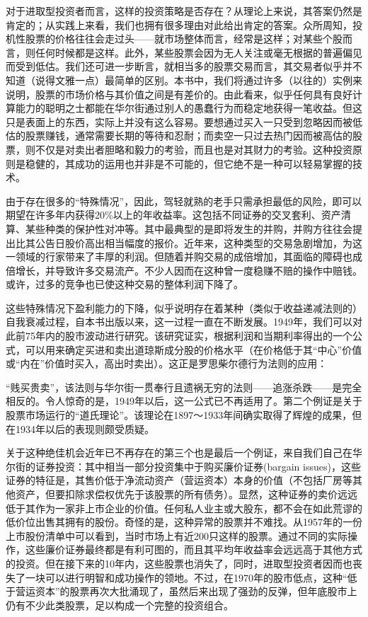 \documentclass[12pt,oneside]{book}
\begin{document}
对于进取型投资者而言，这样的投资策略是否存在？从理论上来说，其答案仍然是肯定的；从实践上来看，我们也拥有很多理由对此给出肯定的答案。众所周知，投机性股票的价格往往会走过头——就市场整体而言，经常是这样；对某些个股而言，则任何时候都是这样。此外，某些股票会因为无人关注或毫无根据的普遍偏见而受到低估。我们还可进一步断言，就相当多的股票交易而言，其交易者似乎并不知道（说得文雅一点）最简单的区别。本书中，我们将通过许多（以往的）实例来说明，股票的市场价格与其价值之间是有差价的。由此看来，似乎任何具有良好计算能力的聪明之士都能在华尔街通过别人的愚蠢行为而稳定地获得一笔收益。但这只是表面上的东西，实际上并没有这么容易。要想通过买入一只受到忽略因而被低估的股票赚钱，通常需要长期的等待和忍耐；而卖空一只过去热门因而被高估的股票，则不仅是对卖出者胆略和毅力的考验，而且也是对其财力的考验。这种投资原则是稳健的，其成功的运用也并非是不可能的，但它绝不是一种可以轻易掌握的技术。

由于存在很多的“特殊情况”，因此，驾轻就熟的老手只需承担最低的风险，即可以期望在许多年内获得20\%以上的年收益率。这包括不同证券的交叉套利、资产清算、某些种类的保护性对冲等。其中最典型的是即将发生的并购，并购方往往会提出比其公告日股价高出相当幅度的报价。近年来，这种类型的交易急剧增加，为这一领域的行家带来了丰厚的利润。但随着并购交易的成倍增加，其面临的障碍也成倍增长，并导致许多交易流产。不少人因而在这种曾一度稳赚不赔的操作中赔钱。或许，过多的竞争也已使这种交易的整体利润下降了。

这些特殊情况下盈利能力的下降，似乎说明存在着某种（类似于收益递减法则的）自我衰减过程，自本书出版以来，这一过程一直在不断发展。1949年，我们可以对此前75年内的股市波动进行研究。该研究证实，根据利润和当期利率得出的一个公式，可以用来确定买进和卖出道琼斯成分股的价格水平（在价格低于其“中心”价值或“内在”价值时买入，高出时卖出）。这正是罗思柴尔德行为法则的应用：

“贱买贵卖”，该法则与华尔街一贯奉行且遗祸无穷的法则——追涨杀跌——是完全相反的。令人惊奇的是，1949年以后，这一公式已不再适用了。第二个例证是关于股票市场运行的“道氏理论”。该理论在1897～1933年间确实取得了辉煌的成果，但在1934年以后的表现则颇受质疑。

关于这种绝佳机会近年已不再存在的第三个也是最后一个例证，来自我们自己在华尔街的证券投资：其中相当一部分投资集中于购买廉价证券(bargain issues)，这些证券的特征是，其售价低于净流动资产（营运资本）本身的价值（不包括厂房等其他资产，但要扣除求偿权优先于该股票的所有债务）。显然，这种证券的卖价远远低于其作为一家非上市企业的价值。任何私人业主或大股东，都不会在如此荒谬的低价位出售其拥有的股份。奇怪的是，这种异常的股票并不难找。从1957年的一份上市股份清单中可以看到，当时市场上有近200只这样的股票。通过不同的实际操作，这些廉价证券最终都是有利可图的，而且其平均年收益率会远远高于其他方式的投资。但在接下来的10年内，这些股票也消失了，同时，进取型投资者因而也丧失了一块可以进行明智和成功操作的领地。不过，在1970年的股市低点，这种“低于营运资本”的股票再次大批涌现了，虽然后来出现了强劲的反弹，但年底股市上仍有不少此类股票，足以构成一个完整的投资组合。
\end{document}
